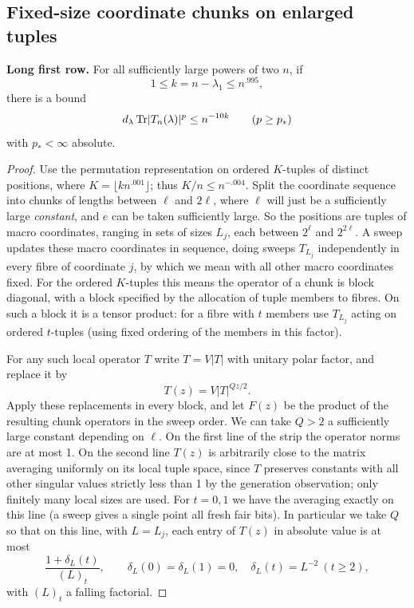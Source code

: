 \subsection{Fixed-size coordinate chunks on enlarged tuples}
\begin{proposition}\label{tra:asymmetric:sparse}
\label{tra:asymmetric:sparse-statement}
\textbf{Long first row.} For all sufficiently large powers of two \(n\), if
\[
                     1\le k=n-\lambda_1\le n^{.995},
\]
there is a bound
\begin{equation}
               d_\lambda\,{\rm Tr}|T_n(\lambda)|^p\le n^{-10k}
                       \qquad (p\ge p_*)
               \label{tra:asymmetric:eq1}
\end{equation}
with \(p_*<\infty\) absolute.
\end{proposition}
\begin{proof}\label{tra:asymmetric:sparse-proof}
\label{tra:asymmetric:macro-coordinate-interpolation}
Use the permutation representation on ordered \(K\)-tuples of distinct positions, where \(K=\lfloor k n^{.001}\rfloor\); thus \(K/n\le n^{-.004}\). Split the coordinate sequence into chunks of lengths between \(\ell\) and \(2\ell\), where \(\ell\) will just be a sufficiently large \emph{constant}, and \(e\) can be taken sufficiently large. So the positions are tuples of macro coordinates, ranging in sets of sizes \(L_j\), each between \(2^\ell\) and \(2^{2\ell}\). A sweep updates these macro coordinates in sequence, doing sweeps \(T_{L_j}\) independently in every fibre of coordinate \(j\), by which we mean with all other macro coordinates fixed. For the ordered \(K\)-tuples this means the operator of a chunk is block diagonal, with a block specified by the allocation of tuple members to fibres. On such a block it is a tensor product: for a fibre with \(t\) members use \(T_{L_j}\) acting on ordered \(t\)-tuples (using fixed ordering of the members in this factor).

For any such local operator \(T\) write \(T=V|T|\) with unitary polar factor, and replace it by
\[
                            T(z)=V |T|^{Qz/2}.
\]
Apply these replacements in every block, and let \(F(z)\) be the product of the resulting chunk operators in the sweep order. We can take \(Q>2\) a sufficiently large constant depending on \(\ell\). On the first line of the strip the operator norms are at most 1. On the second line \(T(z)\) is arbitrarily close to the matrix averaging uniformly on its local tuple space, since \(T\) preserves constants with all other singular values strictly less than 1 by the generation observation; only finitely many local sizes are used. For \(t=0,1\) we have the averaging exactly on this line (a sweep gives a single point all fresh fair bits). In particular we take \(Q\) so that on this line, with \(L=L_j\), each entry of \(T(z)\) in absolute value is at most
\begin{equation}
                \frac{1+\delta_L(t)}{(L)_t},\qquad
       \delta_L(0)=\delta_L(1)=0,\quad \delta_L(t)=L^{-2}\ (t\ge2),
               \label{tra:asymmetric:eq2}
\end{equation}
with \((L)_t\) a falling factorial.


\end{proof}
